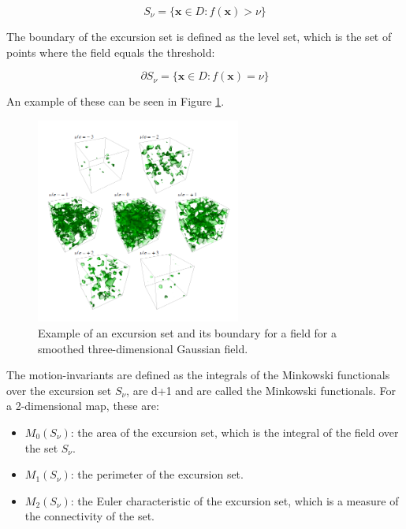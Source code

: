 \begin{equation}
    S_{\nu} = \{ \mathbf{x} \in D : f(\mathbf{x}) > \nu \}
\end{equation}

The boundary of the excursion set is defined as the level set, which is the set of points where the field equals the threshold:

\begin{equation}
    \partial S_{\nu} = \{ \mathbf{x} \in D : f(\mathbf{x}) = \nu \}
\end{equation}

An example of these can be seen in Figure \ref{fig:level_set_example}.

\begin{figure}[t]
    \centering
    \includegraphics[width=0.6\textwidth]{figures/boundaries.png}
    \caption{Example of an excursion set and its boundary for a field for a smoothed three-dimensional Gaussian field.}
    \label{fig:level_set_example}
\end{figure}

The motion-invariants are defined as the integrals of the Minkowski functionals over the excursion set $S_{\nu}$, are d+1 and are called the Minkowski functionals. For a 2-dimensional map, these are:

\begin{itemize}
    \item $M_0(S_{\nu})$: the area of the excursion set, which is the integral of the field over the set $S_{\nu}$.
    \item $M_1(S_{\nu})$: the perimeter of the excursion set.
    \item $M_2(S_{\nu})$: the Euler characteristic of the excursion set, which is a measure of the connectivity of the set.
\end{itemize}

